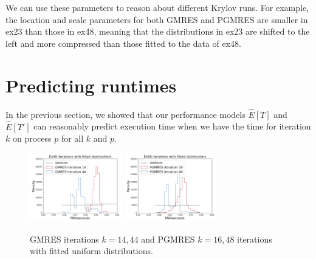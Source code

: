 \documentclass[sigconf]{acmart}
\begin{document}
We can use these parameters to reason about different Krylov runs.
For example, the location and scale parameters for both GMRES and PGMRES are smaller in ex23 than those in ex48, meaning that the distributions in ex23 are shifted to the left and more compressed than those fitted to the data of ex48.
\fi


\section{Predicting runtimes}\label{sec:performance-estimates}

In the previous section, we showed that our performance models $\widehat{E}[T]$ and $\widehat{E}[T']$ can reasonably predict execution time when we have the time for iteration $k$ on process $p$ for all $k$ and $p$. 

\begin{figure}[b]
\centering
\includegraphics[width=4cm]{../plots/GMRES_ex48_8192_1000000_stationary_in_t_with_uniform_14_44.png}
\includegraphics[width=4cm]{../plots/PGMRES_ex48_8192_1000000_stationary_in_t_with_uniform_16_48.png}
\caption{GMRES  iterations $k = 14, 44$ and PGMRES $k = 16, 48$ iterations  with fitted uniform distributions.} \label{fig:iterations-with-fitted-uniform}
\end{figure}
\end{document}
